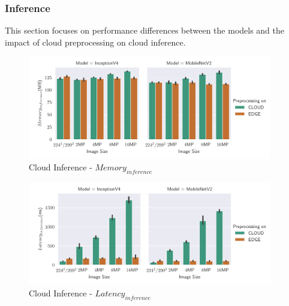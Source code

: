\subsubsection{Inference}
This section focuses on performance differences between the models and the impact of cloud preprocessing on cloud inference.



\begin{figure}[H]
\centering
\includegraphics[width=0.95\textwidth]{./Bilder/single_plots/cloud_inference_plots/Cloud_Inference_Memory.pdf}
\caption{Cloud Inference -  $Memory_{inference}$}
\label{fig:cloudInferenceInferenceMemory}
\end{figure}
\begin{figure}[H]
\centering
\includegraphics[width=0.95\textwidth]{./Bilder/single_plots/cloud_inference_plots/Cloud_Inference_Latency.pdf}
\caption{Cloud Inference -  $Latency_{inference}$}
\label{fig:cloudInferenceInferenceLatency}
\end{figure}



